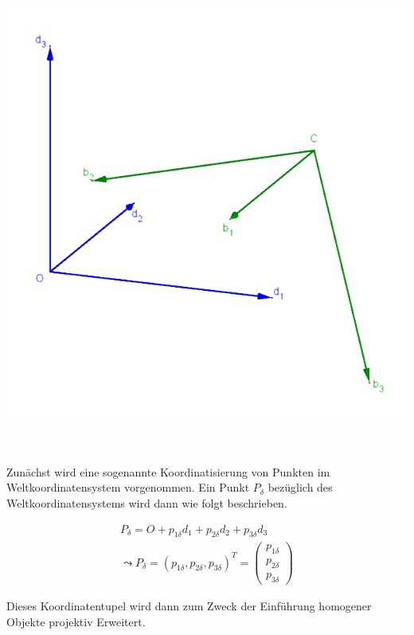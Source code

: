 	\begin{minipage}{\linewidth}
		\centering
		\includegraphics[width=0.6\linewidth]{images/WeltKordSys.png}
	\end{minipage}\\ \\
	
	
Zunächst wird eine sogenannte Koordinatisierung von Punkten im Weltkoordinatensystem vorgenommen. Ein Punkt $P_\delta$ bezüglich des Weltkoordinatensystems wird dann wie folgt beschrieben.

	
	\begin{gather}
	P_\delta = O + p_{1\delta}d_1 + p_{2\delta}d_2 + p_{3\delta}d_3\\
	\leadsto P_\delta = (p_{1\delta},p_{2\delta},p_{3\delta})^T = \begin{pmatrix} p_{1\delta} \\ p_{2\delta} \\ p_{3\delta} \end{pmatrix}
	\end{gather}
	
	Dieses Koordinatentupel wird dann zum Zweck der Einführung homogener Objekte projektiv Erweitert.
	
